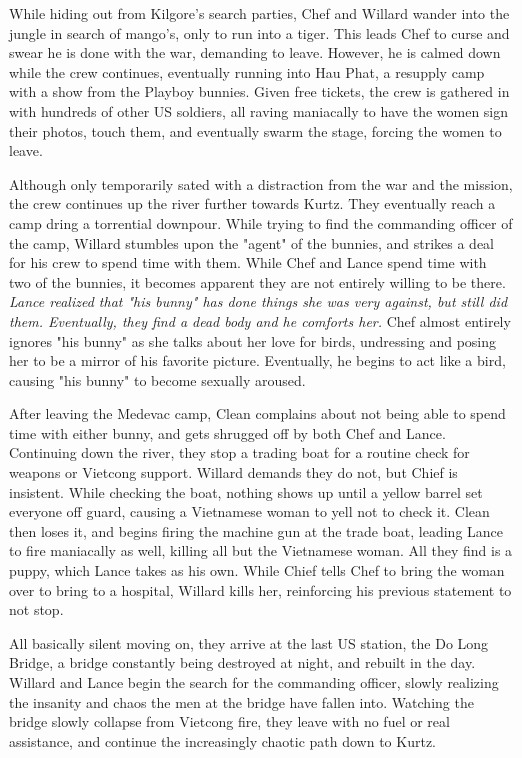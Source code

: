 \documentclass[a4paper,man,natbib]{apa6}
\begin{document}
While hiding out from Kilgore's search parties, Chef and Willard wander into the jungle in search of mango's, only to run into a tiger. This leads Chef to curse and swear he is done with the war, demanding to leave. However, he is calmed down while the crew continues, eventually running into Hau Phat, a resupply camp with a show from the Playboy bunnies. Given free tickets, the crew is gathered in with hundreds of other US soldiers, all raving maniacally to have the women sign their photos, touch them, and eventually swarm the stage, forcing the women to leave.

Although only temporarily sated with a distraction from the war and the mission, the crew continues up the river further towards Kurtz. They eventually reach a camp dring a torrential downpour. While trying to find the commanding officer of the camp, Willard stumbles upon the "agent" of the bunnies, and strikes a deal for his crew to spend time with them. While Chef and Lance spend time with two of the bunnies, it becomes apparent they are not entirely willing to be there. \textit{Lance realized that "his bunny" has done things she was very against, but still did them. Eventually, they find a dead body and he comforts her.} Chef almost entirely ignores "his bunny" as she talks about her love for birds, undressing and posing her to be a mirror of his favorite picture. Eventually, he begins to act like a bird, causing "his bunny" to become sexually aroused.

After leaving the Medevac camp, Clean complains about not being able to spend time with either bunny, and gets shrugged off by both Chef and Lance. Continuing down the river, they stop a trading boat for a routine check for weapons or Vietcong support. Willard demands they do not, but Chief is insistent. While checking the boat, nothing shows up until a yellow barrel set everyone off guard, causing a Vietnamese woman to yell not to check it. Clean then loses it, and begins firing the machine gun at the trade boat, leading Lance to fire maniacally as well, killing all but the Vietnamese woman. All they find is a puppy, which Lance takes as his own. While Chief tells Chef to bring the woman over to bring to a hospital, Willard kills her, reinforcing his previous statement to not stop.

All basically silent moving on, they arrive at the last US station, the Do Long Bridge, a bridge constantly being destroyed at night, and rebuilt in the day. Willard and Lance begin the search for the commanding officer, slowly realizing the insanity and chaos the men at the bridge have fallen into. Watching the bridge slowly collapse from Vietcong fire, they leave with no fuel or real assistance, and continue the increasingly chaotic path down to Kurtz.
\end{document}
